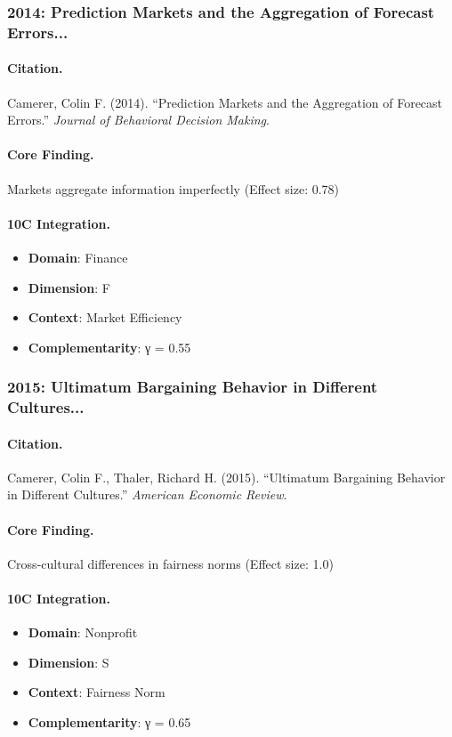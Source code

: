 \subsubsection{2014: Prediction Markets and the Aggregation of Forecast Errors...}

\paragraph{Citation.}
Camerer, Colin F. (2014). ``Prediction Markets and the Aggregation of Forecast Errors.''
\textit{Journal of Behavioral Decision Making}.

\paragraph{Core Finding.}
Markets aggregate information imperfectly (Effect size: 0.78)

\paragraph{10C Integration.}
\begin{itemize}[nosep]
  \item \textbf{Domain}: Finance
  \item \textbf{Dimension}: F
  \item \textbf{Context}: Market Efficiency
  \item \textbf{Complementarity}: γ = 0.55
\end{itemize}

\subsubsection{2015: Ultimatum Bargaining Behavior in Different Cultures...}

\paragraph{Citation.}
Camerer, Colin F., Thaler, Richard H. (2015). ``Ultimatum Bargaining Behavior in Different Cultures.''
\textit{American Economic Review}.

\paragraph{Core Finding.}
Cross-cultural differences in fairness norms (Effect size: 1.0)

\paragraph{10C Integration.}
\begin{itemize}[nosep]
  \item \textbf{Domain}: Nonprofit
  \item \textbf{Dimension}: S
  \item \textbf{Context}: Fairness Norm
  \item \textbf{Complementarity}: γ = 0.65
\end{itemize}

